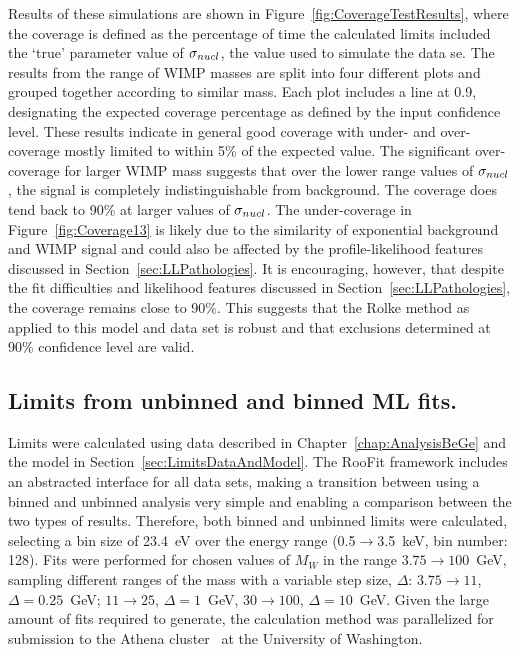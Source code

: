 Results of these simulations are shown in Figure~\ref{fig:CoverageTestResults}, where the coverage is defined as the percentage of time the calculated limits included the `true' parameter value of $\sigma_{nucl}$, the value used to simulate the data se.  The results from the range of WIMP masses are split into four different plots and grouped together according to similar mass.  Each plot includes a line at 0.9, designating the expected coverage percentage as defined by the input confidence level.  These results indicate in general good coverage with under- and over-coverage mostly limited to within 5\% of the expected value.  The significant over-coverage for larger WIMP mass suggests that over the lower range values of $\sigma_{nucl}$, the signal is completely indistinguishable from background.  The coverage does tend back to 90\% at larger values of $\sigma_{nucl}$.  The under-coverage in Figure~\ref{fig:Coverage13} is likely due to the similarity of exponential background and WIMP signal and could also be affected by the profile-likelihood features discussed in Section~\ref{sec:LLPathologies}.  It is encouraging, however, that despite the fit difficulties and likelihood features discussed in Section~\ref{sec:LLPathologies}, the coverage remains close to 90\%.  This suggests that the Rolke method as applied to this model and data set is robust and that exclusions determined at 90\% confidence level are valid.

		\subsection{Limits from unbinned and binned ML fits.}
		\label{sec:LimitsUnbinned}

Limits were calculated using data described in Chapter~\ref{chap:AnalysisBeGe} and the model in Section~\ref{sec:LimitsDataAndModel}.  The RooFit framework includes an abstracted interface for all data sets, making a transition between using a binned and unbinned analysis very simple and enabling a comparison between the two types of results.  Therefore, both binned and unbinned limits were calculated, selecting a bin size of 23.4~eV over the energy range (0.5$\to$3.5~keV, bin number: 128).  
Fits were performed for chosen values of $M_{W}$ in the range $3.75\to100$~GeV, sampling different ranges of the mass with a variable step size, $\Delta$: $3.75\to11$, $\Delta=0.25$~GeV; $11\to25$, $\Delta=1$~GeV, $30\to100$, $\Delta=10$~GeV.  Given the large amount of fits required to generate, the calculation method was parallelized for submission to the Athena cluster~\cite{Athena} at the University of Washington.  
